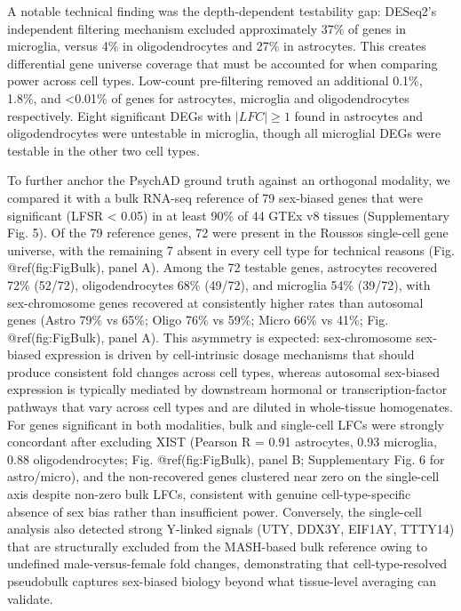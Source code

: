\documentclass[
]{article}
\begin{document}
A notable technical finding was the depth-dependent testability gap:
DESeq2's independent filtering mechanism excluded approximately 37\% of
genes in microglia, versus 4\% in oligodendrocytes and 27\% in
astrocytes. This creates differential gene universe coverage that must
be accounted for when comparing power across cell types. Low-count
pre-filtering removed an additional 0.1\%, 1.8\%, and \textless0.01\% of
genes for astrocytes, microglia and oligodendrocytes respectively. Eight
significant DEGs with \(|LFC| \geq 1\) found in astrocytes and
oligodendrocytes were untestable in microglia, though all microglial
DEGs were testable in the other two cell types.

To further anchor the PsychAD ground truth against an orthogonal
modality, we compared it with a bulk RNA-seq reference of 79 sex-biased
genes that were significant (LFSR \textless{} 0.05) in at least 90\% of
44 GTEx v8 tissues (Supplementary Fig. 5). Of the 79 reference genes, 72
were present in the Roussos single-cell gene universe, with the
remaining 7 absent in every cell type for technical reasons (Fig.
@ref(fig:FigBulk), panel A). Among the 72 testable genes, astrocytes
recovered 72\% (52/72), oligodendrocytes 68\% (49/72), and microglia
54\% (39/72), with sex-chromosome genes recovered at consistently higher
rates than autosomal genes (Astro 79\% vs 65\%; Oligo 76\% vs 59\%;
Micro 66\% vs 41\%; Fig. @ref(fig:FigBulk), panel A). This asymmetry is
expected: sex-chromosome sex-biased expression is driven by
cell-intrinsic dosage mechanisms that should produce consistent fold
changes across cell types, whereas autosomal sex-biased expression is
typically mediated by downstream hormonal or transcription-factor
pathways that vary across cell types and are diluted in whole-tissue
homogenates. For genes significant in both modalities, bulk and
single-cell LFCs were strongly concordant after excluding XIST (Pearson
R = 0.91 astrocytes, 0.93 microglia, 0.88 oligodendrocytes; Fig.
@ref(fig:FigBulk), panel B; Supplementary Fig. 6 for astro/micro), and
the non-recovered genes clustered near zero on the single-cell axis
despite non-zero bulk LFCs, consistent with genuine cell-type-specific
absence of sex bias rather than insufficient power. Conversely, the
single-cell analysis also detected strong Y-linked signals (UTY, DDX3Y,
EIF1AY, TTTY14) that are structurally excluded from the MASH-based bulk
reference owing to undefined male-versus-female fold changes,
demonstrating that cell-type-resolved pseudobulk captures sex-biased
biology beyond what tissue-level averaging can validate.
\end{document}
